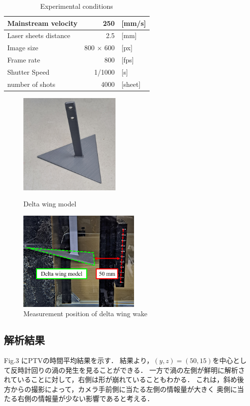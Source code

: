 \documentclass[twocolumn,a4j]{jsarticle}
\begin{document}
\begin{table}[h]
  \label{table:data_type}
  \centering
  \caption{Experimental conditions}
  \begin{tabular}{| l | r | l |}
    \hline
    Mainstream velocity   & 250              & [mm/s]  \\ \hline
    Laser sheets distance & 2.5              & [mm]    \\ \hline
    Image size            & 800 $\times$ 600 & [px]    \\ \hline
    Frame rate            & 800              & [fps]   \\ \hline
    Shutter Speed         & 1/1000           & [s]     \\ \hline
    number of shots       & 4000             & [sheet] \\ \hline
  \end{tabular}
\end{table}

\begin{figure}[htbp]
  \footnotesize
  \begin{center}
    \includegraphics[width=50mm]{../images/delta_wing_model.jpg}
    \caption{Delta wing model}
    \includegraphics[width=60mm]{../images/delta_wing_position.png}
    \caption{Measurement position of delta wing wake}
  \end{center}
\end{figure}

\newpage

\subsection{解析結果}
Fig.3 にPTVの時間平均結果を示す．
結果より，$(y,z) = (50, 15)$を中心として反時計回りの渦の発生を見ることができる．
一方で渦の左側が鮮明に解析されていることに対して，右側は形が崩れていることもわかる．
これは，斜め後方からの撮影によって，カメラ手前側に当たる左側の情報量が大きく
奥側に当たる右側の情報量が少ない影響であると考える．
\end{document}

